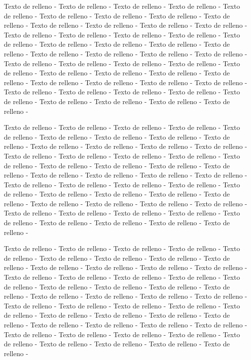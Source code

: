 \documentclass[twocolumn,twoside]{article}
\newlength{\distanciaA}
\begin{document}
	

\newlength{\distanciaB}
\setlength{\distanciaB}{1in}

	
\setlength{\baselineskip}{\dimexpr(0.1\distanciaA +0.2\distanciaB)\relax}
\setlength{\columnsep}{0.5in}
\setlength{\columnwidth}{3in}
\setlength{\oddsidemargin}{0.1in}
\setlength{\parskip}{0.01\columnwidth}
\setlength{\parindent}{2in}
\setlength{\topmargin}{\dimexpr(2in+\distanciaA/\columnwidth)\relax}

Texto de relleno - Texto de relleno - Texto de relleno - Texto de relleno - Texto de relleno - Texto de relleno - Texto de relleno - Texto de relleno - Texto de relleno - Texto de relleno - Texto de relleno - Texto de relleno - Texto de relleno - Texto de relleno - Texto de relleno - Texto de relleno - Texto de relleno - Texto de relleno - Texto de relleno - Texto de relleno - Texto de relleno - Texto de relleno - Texto de relleno - Texto de relleno - Texto de relleno - Texto de relleno - Texto de relleno - Texto de relleno - Texto de relleno - Texto de relleno - Texto de relleno - Texto de relleno - Texto de relleno - Texto de relleno - Texto de relleno - Texto de relleno - Texto de relleno - Texto de relleno - Texto de relleno - Texto de relleno - Texto de relleno - Texto de relleno - Texto de relleno - Texto de relleno - Texto de relleno - Texto de relleno - Texto de relleno - Texto de relleno - 


Texto de relleno - Texto de relleno - Texto de relleno - Texto de relleno - Texto de relleno - Texto de relleno - Texto de relleno - Texto de relleno - Texto de relleno - Texto de relleno - Texto de relleno - Texto de relleno - Texto de relleno - Texto de relleno - Texto de relleno - Texto de relleno - Texto de relleno - Texto de relleno - Texto de relleno - Texto de relleno - Texto de relleno - Texto de relleno - Texto de relleno - Texto de relleno - Texto de relleno - Texto de relleno - Texto de relleno - Texto de relleno - Texto de relleno - Texto de relleno - Texto de relleno - Texto de relleno - Texto de relleno - Texto de relleno - Texto de relleno - Texto de relleno - Texto de relleno - Texto de relleno - Texto de relleno - Texto de relleno - Texto de relleno - Texto de relleno - Texto de relleno - Texto de relleno - Texto de relleno - Texto de relleno - Texto de relleno - Texto de relleno -


Texto de relleno - Texto de relleno - Texto de relleno - Texto de relleno - Texto de relleno - Texto de relleno - Texto de relleno - Texto de relleno - Texto de relleno - Texto de relleno - Texto de relleno - Texto de relleno - Texto de relleno - Texto de relleno - Texto de relleno - Texto de relleno - Texto de relleno - Texto de relleno - Texto de relleno - Texto de relleno - Texto de relleno - Texto de relleno - Texto de relleno - Texto de relleno - Texto de relleno - Texto de relleno - Texto de relleno - Texto de relleno - Texto de relleno - Texto de relleno - Texto de relleno - Texto de relleno - Texto de relleno - Texto de relleno - Texto de relleno - Texto de relleno - Texto de relleno - Texto de relleno - Texto de relleno - Texto de relleno - Texto de relleno - Texto de relleno - Texto de relleno - Texto de relleno - Texto de relleno - Texto de relleno - Texto de relleno - Texto de relleno -
\end{document}
